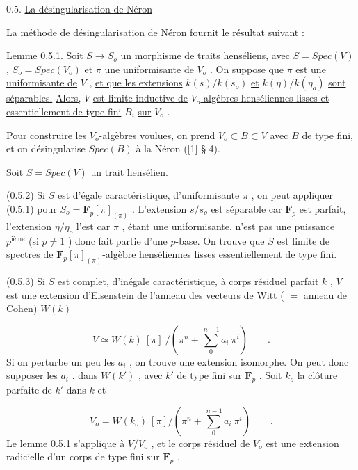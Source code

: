 0.5.  \underline{La désingularisation de Néron}

La méthode de désingularisation de Néron fournit le résultat suivant :

\underline{Lemme} 0.5.1.  \underline{Soit}  $S \longrightarrow S_o$  \underline{un morphisme de traits henséliens,}  \underline{avec}  $S = Spec(V)$ ,  $S_o = Spec(V_o)$  \underline{et}  $\pi$  \underline{une uniformisante de}  $V_o$ .  \underline{On suppose que}  $\pi$  \underline{est une uniformisante de}  $V$ ,  \underline{et que les extensions}  $k(s)/k(s_o)$  \underline{et}  $k(\eta)/k(\eta_o)$  \underline{sont séparables.}  \underline{Alors,}  $V$  \underline{est limite inductive de}  $V_o$\underline{-algébres henséliennes lisses et essentiellement de type fini}  $B_i$  \underline{sur}  $V_o$ .



Pour construire les  $V_o$-algèbres voulues, on prend  $V_o \subset B \subset V$  avec  $B$  de type fini, et on désingularise  $Spec(B)$  à la Néron  ([1]  § 4).

Soit  $S = Spec(V)$  un trait hensélien.

(0.5.2)  Si  $S$  est d'égale caractéristique, d'uniformisante  $\pi$ , on peut appliquer (0.5.1) pour  $S_o = \mathbf{F}_p[\pi]_{(\pi)}$ . L'extension  $s/s_o$  est séparable car  $\mathbf{F}_p$  est parfait, l'extension  $\eta/\eta_o$  l'est car  $\pi$ , étant une uniformisante, n'est pas une puissance  $p^{\text{ième}}$  (si  $p \neq 1$ ) donc fait partie d'une $p$-base. On trouve que  $S$  est limite de spectres de  $\mathbf{F}_p[\pi]_{(\pi)}$-algèbre henséliennes lisses essentiellement de type fini.

(0.5.3)  Si  $S$  est complet, d'inégale caractéristique, à corps résiduel parfait  $k$ , $V$  est une extension d'Eisenstein de l'anneau des vecteurs de Witt  ( $=$ anneau de Cohen)  $W(k)$

\begin{equation*}
V \simeq W(k) \ [\pi] \ /(\pi^n + \sum_0^{\,n-1} a_i \ \pi^i) \qquad .
\end{equation*}
Si on perturbe un peu les  $a_i$ , on trouve une extension isomorphe. On peut donc supposer les  $a_i$ . dans  $W(k')$ , avec  $k'$  de type fini sur  $\mathbf{F}_p$ . Soit  $k_o$  la clôture parfaite de  $k'$  dans  $k$ et

\begin{equation*}
V_o = W(k_o) \ [\pi]/(\pi^n + \sum_0^{\,n-1} a_i \ \pi^i) \qquad .
\end{equation*}
Le lemme 0.5.1 s'applique à  $V/V_o$ , et le corps résiduel de  $V_o$  est une extension radicielle d'un corps de type fini sur  $\mathbf{F}_p$  .


